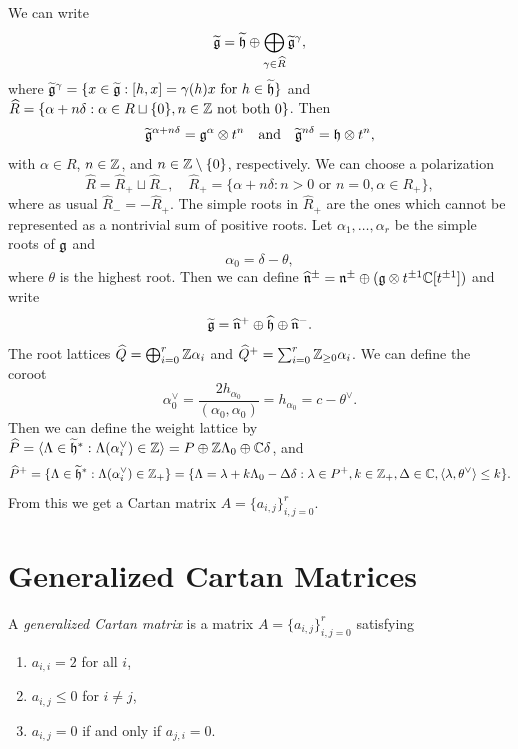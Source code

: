 \begin{remark}
  We can write
  \[
    \widetilde{\mathfrak{g}} = \widetilde{\mathfrak{h}}
    \oplus \bigoplus_{\gamma \in \widehat{R}}
    \widetilde{\mathfrak{g}}^\gamma,
  \]
  where $\widetilde{\mathfrak{g}}^\gamma = \{x \in \widetilde{\mathfrak{g}} : [h, x] = \gamma(h) x \text{ for } h \in \widetilde{\mathfrak{h}}\}$
  and $\widehat{R} = \{\alpha + n \delta : \alpha \in R \sqcup \{0\}, n \in \mathbb{Z} \text{ not both $0$}\}$.
  Then
  \[
    \widetilde{\mathfrak{g}}^{\alpha + n \delta}
    = \mathfrak{g}^\alpha \otimes t^n
    \quad \text{and} \quad
    \widetilde{\mathfrak{g}}^{n \delta} = \mathfrak{h} \otimes t^n,
  \]
  with $\alpha \in R$, $n \in \mathbb{Z}$, and
  $n \in \mathbb{Z} \setminus \{0\}$, respectively.
  We can choose a polarization
  \[
    \widehat{R} = \widehat{R}_+ \sqcup \widehat{R}_-,
    \quad \widehat{R}_+ = \{\alpha + n \delta : n > 0 \text{ or } n = 0, \alpha \in R_+\},
  \]
  where as usual $\widehat{R}_- = - \widehat{R}_+$.
  The simple roots in $\widehat{R}_+$ are
  the ones which cannot be represented
  as a nontrivial sum of positive roots.
  Let $\alpha_1, \dots, \alpha_r$ be
  the simple roots of $\mathfrak{g}$ and
  \[
    \alpha_0 = \delta - \theta,
  \]
  where $\theta$ is the highest root. Then
  we can define
  $\widehat{\mathfrak{n}}^{\pm}
    = \mathfrak{n}^{\pm}
    \oplus (\mathfrak{g} \otimes t^{\pm 1} \mathbb{C}[t^{\pm 1}])$
  and write
  \[
    \widetilde{\mathfrak{g}}
    = \widehat{\mathfrak{n}}^+ \oplus \widehat{\mathfrak{h}} \oplus \widehat{\mathfrak{n}}^-.
  \]
  The root lattices $\widehat{Q} = \bigoplus_{i = 0}^r \mathbb{Z} \alpha_i$
  and $\widehat{Q}^+= \sum_{i = 0}^r \mathbb{Z}_{\geq 0} \alpha_i$.
  We can define the coroot
  \[
    \alpha_0^\vee
    = \frac{2h_{\alpha_0}}{(\alpha_0, \alpha_0)}
    = h_{\alpha_0}
    = c - \theta^\vee.
  \]
  Then we can define the weight lattice by
  $\widehat{P} = \langle \Lambda \in \widetilde{\mathfrak{h}}^* : \Lambda(\alpha_i^\vee) \in \mathbb{Z} \rangle = P \oplus \mathbb{Z} \Lambda_0 \oplus \mathbb{C} \delta$, and
  \[
    \widehat{P}^+
    = \{\Lambda \in \widetilde{\mathfrak{h}}^* : \Lambda(\alpha_i^\vee) \in \mathbb{Z}_+\}
    = \{\Lambda = \lambda + k \Lambda_0 - \Delta \delta : \lambda \in P^+, k \in \mathbb{Z}_+, \Delta \in \mathbb{C}, \langle \lambda, \theta^\vee \rangle \le k\}.
  \]
  From this we get a Cartan matrix
  $A = \{a_{i, j}\}_{i, j = 0}^r$.
\end{remark}

\section{Generalized Cartan Matrices}
\begin{remark}
  A \emph{generalized Cartan matrix}
  is a matrix $A = \{a_{i, j}\}_{i, j = 0}^r$
  satisfying
  \begin{enumerate}
    \item $a_{i, i} = 2$ for all $i$,
    \item $a_{i, j} \le 0$ for $i \ne j$,
    \item $a_{i, j} = 0$ if and only if
      $a_{j, i} = 0$.
  \end{enumerate}
\end{remark}


